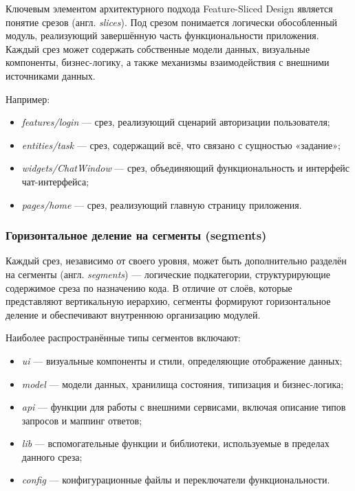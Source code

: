 Ключевым элементом архитектурного подхода Feature-Sliced Design является понятие срезов (англ. \textit{slices}). Под срезом понимается логически обособленный модуль, реализующий завершённую часть функциональности приложения. Каждый срез может содержать собственные модели данных, визуальные компоненты, бизнес-логику, а также механизмы взаимодействия с внешними источниками данных.

Например:
\begin{itemize}
  \item \textit{features/login} — срез, реализующий сценарий авторизации пользователя;
  \item \textit{entities/task} — срез, содержащий всё, что связано с сущностью «задание»;
  \item \textit{widgets/ChatWindow} — срез, объединяющий функциональность и интерфейс чат-интерфейса;
  \item \textit{pages/home} — срез, реализующий главную страницу приложения.
\end{itemize}

\subsubsection{Горизонтальное деление на сегменты (segments)}

Каждый срез, независимо от своего уровня, может быть дополнительно разделён на сегменты (англ. \textit{segments}) — логические подкатегории, структурирующие содержимое среза по назначению кода. В отличие от слоёв, которые представляют вертикальную иерархию, сегменты формируют горизонтальное деление и обеспечивают внутреннюю организацию модулей.

Наиболее распространённые типы сегментов включают:
\begin{itemize}
  \item \textit{ui} — визуальные компоненты и стили, определяющие отображение данных;
  \item \textit{model} — модели данных, хранилища состояния, типизация и бизнес-логика;
  \item \textit{api} — функции для работы с внешними сервисами, включая описание типов запросов и маппинг ответов;
  \item \textit{lib} — вспомогательные функции и библиотеки, используемые в пределах данного среза;
  \item \textit{config} — конфигурационные файлы и переключатели функциональности.
\end{itemize}

